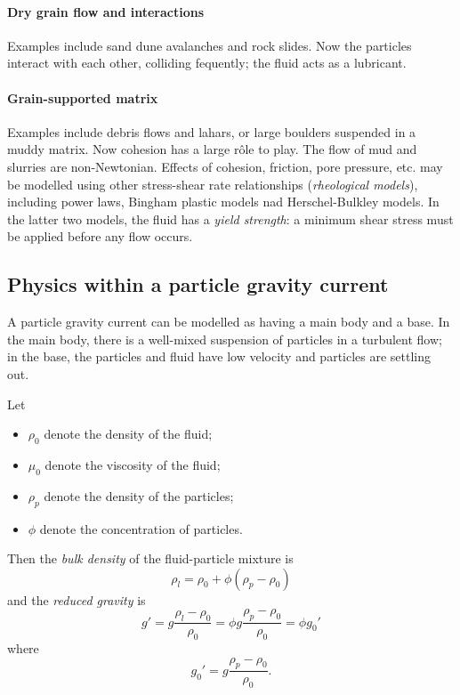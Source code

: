 \paragraph{Dry grain flow and interactions} Examples include sand dune
avalanches and rock slides. Now the particles interact with each other,
colliding fequently; the fluid acts as a lubricant. 

\paragraph{Grain-supported matrix} Examples include debris flows and lahars, or
large boulders suspended in a muddy matrix. Now cohesion has a large r\^ole to
play. The flow of mud and slurries are non-Newtonian. Effects of cohesion,
friction, pore pressure, etc. may be modelled using other stress-shear rate
relationships (\textit{rheological models}), including power laws, Bingham
plastic models nad Herschel-Bulkley models. In the latter two models, the fluid
has a \textit{yield strength}: a minimum shear stress must be applied before any
flow occurs. 

\subsection{Physics within a particle gravity current}

A particle gravity current can be modelled as having a main body and a base. In
the main body, there is a well-mixed suspension of particles in a turbulent
flow; in the base, the particles and fluid have low velocity and particles are
settling out. 

Let
\begin{itemize}
 \item $\rho_0$ denote the density of the fluid;
 \item $\mu_0$ denote the viscosity of the fluid;
 \item $\rho_p$ denote the density of the particles;
 \item $\phi$ denote the concentration of particles.
\end{itemize}
Then the \textit{bulk density} of the fluid-particle mixture is
\begin{equation}
    \rho_l = \rho_0 + \phi (\rho_p - \rho_0) 
\end{equation}
and the \textit{reduced gravity} is
\begin{equation}
 g' = g \frac{\rho_l - \rho_0}{\rho_0} = \phi g \frac{\rho_p - \rho_0}{\rho_0} = \phi g_0'
\end{equation}
where
\begin{equation}
    g_0' = g \frac{\rho_p - \rho_0}{\rho_0}.
\end{equation}

